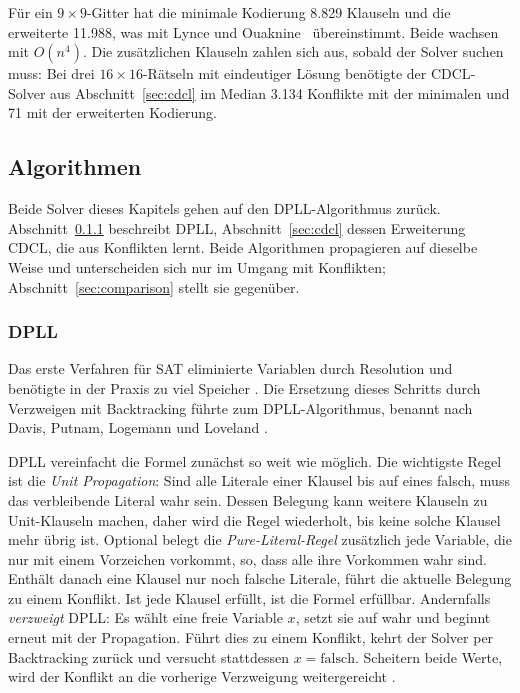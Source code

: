 Für ein $9 \times 9$-Gitter hat die minimale Kodierung 8.829 Klauseln und die erweiterte 11.988, was mit Lynce und Ouaknine~\parencite*[4\psq]{lynce2006} übereinstimmt.
Beide wachsen mit $O(n^4)$.
Die zusätzlichen Klauseln zahlen sich aus, sobald der Solver suchen muss: Bei drei $16 \times 16$-Rätseln mit eindeutiger Lösung benötigte der \acs{CDCL}-Solver aus Abschnitt~\ref{sec:cdcl} im Median 3.134 Konflikte mit der minimalen und 71 mit der erweiterten Kodierung.

\subsection{Algorithmen} \label{sec:algorithms}

Beide Solver dieses Kapitels gehen auf den DPLL-Algorithmus zurück.
Abschnitt~\ref{sec:dpll} beschreibt DPLL, Abschnitt~\ref{sec:cdcl} dessen Erweiterung \acs{CDCL}, die aus Konflikten lernt.
Beide Algorithmen propagieren auf dieselbe Weise und unterscheiden sich nur im Umgang mit Konflikten; Abschnitt~\ref{sec:comparison} stellt sie gegenüber.

\subsubsection{DPLL} \label{sec:dpll}

Das erste Verfahren für \acs{SAT} eliminierte Variablen durch Resolution und benötigte in der Praxis zu viel Speicher \parencites[vgl.][210]{davis1960}[394]{davis1962}.
Die Ersetzung dieses Schritts durch Verzweigen mit Backtracking führte zum DPLL-Algorithmus, benannt nach Davis, Putnam, Logemann und Loveland .

DPLL vereinfacht die Formel zunächst so weit wie möglich.
Die wichtigste Regel ist die \emph{Unit Propagation}: Sind alle Literale einer Klausel bis auf eines falsch, muss das verbleibende Literal wahr sein.
Dessen Belegung kann weitere Klauseln zu Unit-Klauseln machen, daher wird die Regel wiederholt, bis keine solche Klausel mehr übrig ist.
Optional belegt die \emph{Pure-Literal-Regel} zusätzlich jede Variable, die nur mit einem Vorzeichen vorkommt, so, dass alle ihre Vorkommen wahr sind.
Enthält danach eine Klausel nur noch falsche Literale, führt die aktuelle Belegung zu einem Konflikt.
Ist jede Klausel erfüllt, ist die Formel erfüllbar.
Andernfalls \emph{verzweigt} DPLL: Es wählt eine freie Variable $x$, setzt sie auf wahr und beginnt erneut mit der Propagation.
Führt dies zu einem Konflikt, kehrt der Solver per Backtracking zurück und versucht stattdessen $x = \text{falsch}$.
Scheitern beide Werte, wird der Konflikt an die vorherige Verzweigung weitergereicht \parencites[vgl.][209--212]{davis1960}[394\psq]{davis1962}.

